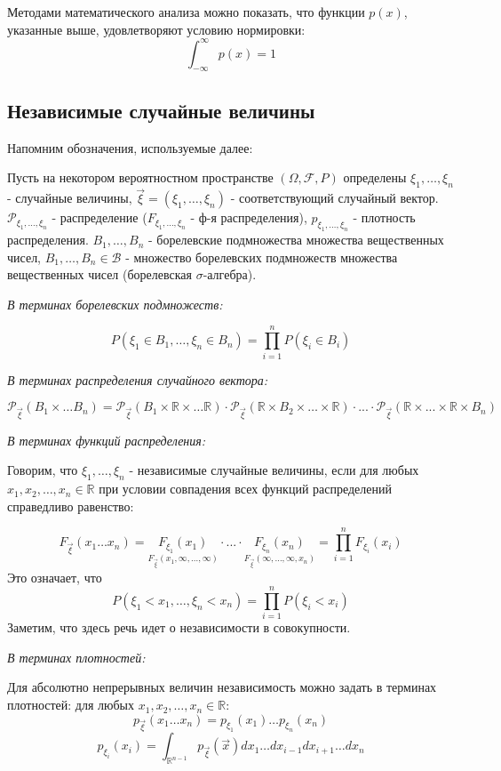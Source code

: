Методами математического анализа можно показать, что функции $p(x)$, указанные выше, удовлетворяют условию
нормировки:
\[ \int_{-\infty}^{\infty} p(x) = 1 \]

\subsection{Независимые случайные величины}

\begin{definition}
	
	Напомним обозначения, используемые далее:
	
	Пусть на некотором вероятностном пространстве $(\Omega, \mathcal{F}, P)$ определены $\xi_1, \dots, \xi_n$ - случайные величины, $\vec{\xi} = (\xi_1, \dots, \xi_n)$ - соответствующий случайный вектор. $\mathcal{P}_{\xi_1, \dots, \xi_n}$ - распределение ($F_{\xi_1, \dots, \xi_n}$ - ф-я распределения), $p_{\xi_1, \dots, \xi_n}$ - плотность распределения. $B_1, \dots, B_n$ - борелевские подмножества множества вещественных чисел, $B_1, \dots, B_n \in \mathcal{B}$ - множество борелевских подмножеств множества вещественных чисел (борелевская $\sigma$-алгебра).
	
	\textit{В терминах борелевских подмножеств:}
	
	\[ P(\xi_1 \in B_1, \dots, \xi_n \in B_n) = \prod_{i=1}^{n} P(\xi_i \in B_i) \]
	
	\textit{В терминах распределения случайного вектора:}
	
	\[ \mathcal{P}_{\vec{\xi}} (B_1 \times \dots B_n) = \mathcal{P}_{\vec{\xi}} (B_1 \times \mathbb{R} \times \dots \mathbb{R}) \cdot \mathcal{P}_{\vec{\xi}} (\mathbb{R} \times B_2 \times \dots \times \mathbb{R}) \cdot ... \cdot \mathcal{P}_{\vec{\xi}} (\mathbb{R} \times ... \times \mathbb{R} \times B_n) \]
	
	\textit{В терминах функций распределения:}
	
	Говорим, что $\xi_1, \dots, \xi_n$ - независимые случайные величины, если для любых $x_1, x_2, \dots, x_n \in \mathbb{R}$ при условии совпадения всех функций распределений справедливо равенство:
	
	\[ F_{\vec{\xi}} (x_1 \dots x_n) = \underset{F_{\vec{\xi}}(x_1, \infty, \dots, \infty)}{F_{\xi_1}(x_1)} \cdot ... \cdot \underset{F_{\vec{\xi}}(\infty, \dots, \infty, x_n)}{F_{\xi_n}(x_n)} = \prod_{i=1}^{n} F_{\xi_i} (x_i) \]
	Это означает, что
	\[ P(\xi_1 < x_1, \dots, \xi_n < x_n) = \prod_{i=1}^{n} P(\xi_i < x_i) \]
	Заметим, что здесь речь идет о независимости в совокупности.
	
	\textit{В терминах плотностей:}
	
	Для абсолютно непрерывных величин независимость можно задать в терминах плотностей: для любых $x_1, x_2, \dots, x_n \in \mathbb{R}$:
	\[ p_{\vec{\xi}} (x_1 \dots x_n) = p_{\xi_1} (x_1) \dots p_{\xi_n} (x_n) \]
	\[ p_{\xi_i} (x_i) = \int_{\mathbb{R}^{n-1}} p_{\vec{\xi}} (\vec{x}) dx_1 \dots dx_{i-1} dx_{i+1} \dots dx_n \]
\end{definition}

